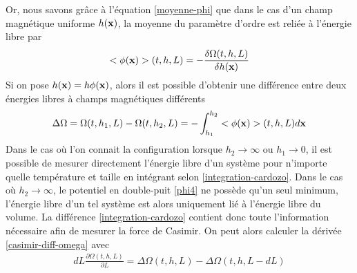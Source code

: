 Or, nous savons grâce à l'équation \ref{moyenne-phi} que dans le cas d'un champ magnétique uniforme $h({\bf x})$, la moyenne du paramètre d'ordre est reliée à l'énergie libre par
\begin{align}
    <\phi({\bf x})>(t,h,L) = - \frac{\delta \Omega(t,h,L)}{\delta h({\bf x})}
\end{align} 
Si on pose $h({\bf x}) = h \phi({\bf x})$, alors il est possible d'obtenir une différence entre deux énergies libres à champs magnétiques différents \cite{lopes_cardozo_critical_2014} 
\begin{align}
    \Delta \Omega = \Omega(t,h_1,L) - \Omega(t,h_2,L) = - \int_{h_1}^{h_2} <\phi({\bf x})>(t,h,L) d{\bf x}
    \label{integration-cardozo}
\end{align}
Dans le cas où l'on connait la configuration lorsque $h_2 \to \infty$ ou $h_1 \to 0$, il est possible de mesurer directement l'énergie libre d'un système pour n'importe quelle température et taille en intégrant selon \ref{integration-cardozo}. Dans le cas où $h_2 \to \infty$, le potentiel en double-puit \ref{phi4} ne possède qu'un seul minimum, l'énergie libre d'un tel système est alors uniquement lié à l'énergie libre du volume.
La différence \ref{integration-cardozo} contient donc toute l'information nécessaire afin de mesurer la force de Casimir. On peut alors calculer la dérivée \ref{casimir-diff-omega} avec
\begin{align}
    dL \frac{\partial \Omega(t,h,L)}{\partial L} = \Delta \Omega(t,h,L)-\Delta \Omega(t,h,L-dL)
\end{align}

